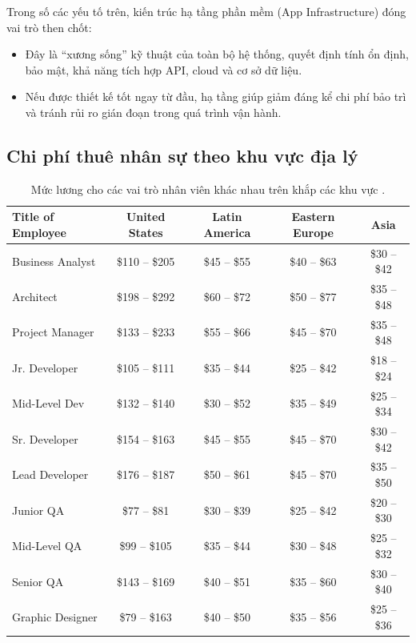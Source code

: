     
      Trong số các yếu tố trên, kiến trúc hạ tầng phần mềm (App Infrastructure) đóng vai trò then chốt:
      \setlength{\leftmargini}{1.5cm}
      \begin{itemize}
          \item Đây là “xương sống” kỹ thuật của toàn bộ hệ thống, quyết định tính ổn định, bảo mật, khả năng tích hợp API, cloud và cơ sở dữ liệu.
          \item Nếu được thiết kế tốt ngay từ đầu, hạ tầng giúp giảm đáng kể chi phí bảo trì và tránh rủi ro gián đoạn trong quá trình vận hành.
      \end{itemize}
    \vspace{0.5em}

\subsection{Chi phí thuê nhân sự theo khu vực địa lý}

\begin{table}[ht]
  \centering
  \begin{tabular}{|p{3.2cm}|c|c|c|c|}
  \hline
  \textbf{Title of Employee} & \textbf{United States} & \textbf{Latin America} & \textbf{Eastern Europe} & \textbf{Asia} \\
  \hline
  Business Analyst    & \$110 -- \$205 & \$45 -- \$55 & \$40 -- \$63 & \$30 -- \$42 \\
  Architect           & \$198 -- \$292 & \$60 -- \$72 & \$50 -- \$77 & \$35 -- \$48 \\
  Project Manager     & \$133 -- \$233 & \$55 -- \$66 & \$45 -- \$70 & \$35 -- \$48 \\
  Jr. Developer       & \$105 -- \$111 & \$35 -- \$44 & \$25 -- \$42 & \$18 -- \$24 \\
  Mid-Level Dev & \$132 -- \$140 & \$30 -- \$52 & \$35 -- \$49 & \$25 -- \$34 \\
  Sr. Developer       & \$154 -- \$163 & \$45 -- \$55 & \$45 -- \$70 & \$30 -- \$42 \\
  Lead Developer      & \$176 -- \$187 & \$50 -- \$61 & \$45 -- \$70 & \$35 -- \$50 \\
  Junior QA           & \$77 -- \$81   & \$30 -- \$39 & \$25 -- \$42 & \$20 -- \$30 \\
  Mid-Level QA        & \$99 -- \$105  & \$35 -- \$44 & \$30 -- \$48 & \$25 -- \$32 \\
  Senior QA           & \$143 -- \$169 & \$40 -- \$51 & \$35 -- \$60 & \$30 -- \$40 \\
  Graphic Designer    & \$79 -- \$163  & \$40 -- \$50 & \$35 -- \$56 & \$25 -- \$36 \\
  \hline
  \end{tabular}
  \caption{Mức lương cho các vai trò nhân viên khác nhau trên khắp các khu vực \cite{rubygarageWebCost}.}
  \label{tab:salary-comparison}
  \end{table}
  
